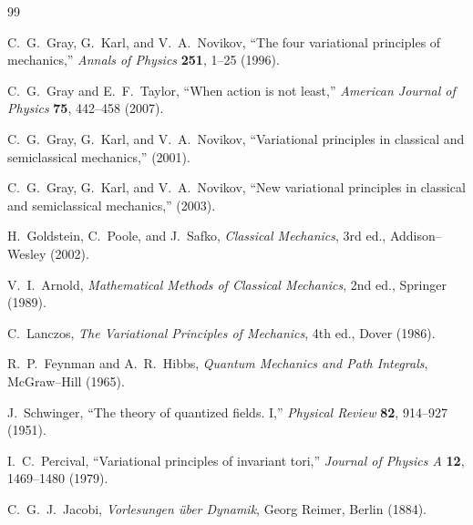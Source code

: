 \begin{thebibliography}{99}

C.~G.~Gray, G.~Karl, and V.~A.~Novikov,
``The four variational principles of mechanics,''
\emph{Annals of Physics} \textbf{251}, 1--25 (1996).

C.~G.~Gray and E.~F.~Taylor,
``When action is not least,''
\emph{American Journal of Physics} \textbf{75}, 442--458 (2007).

C.~G.~Gray, G.~Karl, and V.~A.~Novikov,
``Variational principles in classical and semiclassical mechanics,''
(2001).

C.~G.~Gray, G.~Karl, and V.~A.~Novikov,
``New variational principles in classical and semiclassical mechanics,''
(2003).

H.~Goldstein, C.~Poole, and J.~Safko,
\emph{Classical Mechanics},
3rd ed., Addison--Wesley (2002).

V.~I.~Arnold,
\emph{Mathematical Methods of Classical Mechanics},
2nd ed., Springer (1989).

C.~Lanczos,
\emph{The Variational Principles of Mechanics},
4th ed., Dover (1986).

R.~P.~Feynman and A.~R.~Hibbs,
\emph{Quantum Mechanics and Path Integrals},
McGraw--Hill (1965).

J.~Schwinger,
``The theory of quantized fields. I,''
\emph{Physical Review} \textbf{82}, 914--927 (1951).

I.~C.~Percival,
``Variational principles of invariant tori,''
\emph{Journal of Physics A} \textbf{12}, 1469--1480 (1979).

C.~G.~J.~Jacobi,
\emph{Vorlesungen \"uber Dynamik},
Georg Reimer, Berlin (1884).

\end{thebibliography}
 
